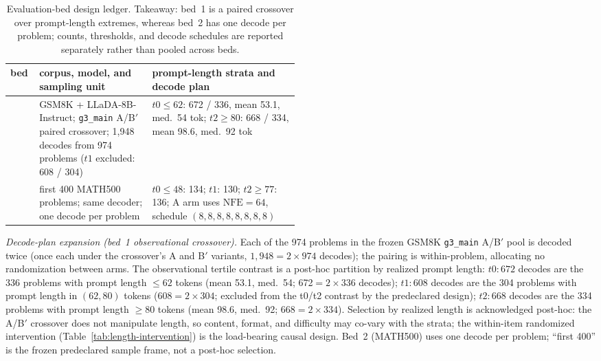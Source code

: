\documentclass{article}
\begin{document}
\begin{table}[h]
\centering
\caption{Evaluation-bed design ledger.  Takeaway: bed~1 is a paired crossover over
prompt-length extremes, whereas bed~2 has one decode per problem; counts, thresholds,
and decode schedules are reported separately rather than pooled across beds.}
\label{tab:bed-design}
\small
\begin{tabularx}{\linewidth}{@{}>{\raggedright\arraybackslash}p{0.10\linewidth}>{\raggedright\arraybackslash}p{0.39\linewidth}X@{}}
\toprule
bed & corpus, model, and sampling unit & prompt-length strata and decode plan \\
\midrule
1 & GSM8K + LLaDA-8B-Instruct; \texttt{g3\_main} A/B$'$ paired crossover; 1,948 decodes from 974 problems ($t1$ excluded: 608 / 304) & $t0{\le}62$: 672 / 336, mean 53.1, med.\ 54 tok; $t2{\ge}80$: 668 / 334, mean 98.6, med.\ 92 tok \\
2 & first 400 MATH500 problems; same decoder; one decode per problem & $t0{\le}48$: 134; $t1$: 130; $t2{\ge}77$: 136; A arm uses $\mathrm{NFE}{=}64$, schedule $(8,8,8,8,8,8,8,8)$ \\
\bottomrule
\end{tabularx}
\normalsize
\vspace{2pt}
\begin{minipage}{\linewidth}\small\emph{Decode-plan expansion (bed~1 observational crossover).}  Each of
the 974 problems in the frozen GSM8K \texttt{g3\_main} A/B$'$ pool is decoded twice
(once each under the crossover's A and B$'$ variants, $1{,}948 = 2\times974$ decodes);
the pairing is within-problem, allocating no randomization between arms.  The
observational tertile contrast is a post-hoc partition by realized prompt length:
$t0{:}672$ decodes are the 336 problems with prompt length $\le 62$ tokens
(mean 53.1, med.\ 54; 672$=2\times336$ decodes); $t1{:}608$ decodes are the 304
problems with prompt length in $(62, 80)$ tokens ($608=2\times304$; excluded from
the t0/t2 contrast by the predeclared design); $t2{:}668$ decodes are the 334
problems with prompt length $\ge 80$ tokens (mean 98.6, med.\ 92;
$668=2\times334$).  Selection by realized length is acknowledged post-hoc: the A/B$'$
crossover does not manipulate length, so content, format, and difficulty may co-vary
with the strata; the within-item randomized intervention
(Table~\ref{tab:length-intervention}) is the load-bearing causal design.
Bed~2 (MATH500) uses one decode per problem; ``first 400'' is the frozen
predeclared sample frame, not a post-hoc selection.
\end{minipage}
\end{table}
\end{document}
